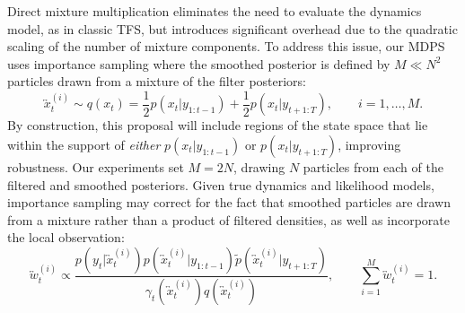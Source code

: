     
    Direct mixture multiplication eliminates the need to evaluate the dynamics model, as in classic TFS, but introduces significant overhead due to the quadratic scaling of the number of mixture components. To address this issue, our MDPS uses importance sampling where the smoothed posterior is defined by $M \ll N^2$ particles drawn from a mixture of the filter posteriors:
    \begin{equation}
        \overleftrightarrow{x}_{t}^{(i)} \sim q(x_t) = \frac{1}{2}p(x_t|y_{1:t-1}) + \frac{1}{2} p(x_t|y_{t+1:T}), \quad\quad i=1,\ldots,M.
        \label{eqn:mdps_resampling_for_combination}
    \end{equation}
    By construction, this proposal will include regions of the state space that lie within the support of \emph{either} $p(x_t|y_{1:t-1})$ or $p(x_t|y_{t+1:T})$, improving robustness.  
    Our experiments set $M=2N$, drawing $N$ particles from each of the filtered and smoothed posteriors.
    Given true dynamics and likelihood models, importance sampling may correct for the fact that smoothed particles are drawn from a mixture rather than a product of filtered densities, as well as incorporate the local observation:
    \begin{equation}
        \overleftrightarrow{w}_{t}^{(i)} \propto \frac{ p(y_t|\overleftrightarrow{x}_{t}^{(i)}) p(\overleftrightarrow{x}_{t}^{(i)}|y_{1:t-1}) \tilde{p}(\overleftrightarrow{x}_{t}^{(i)}| y_{t+1:T})  }{\gamma_t(\overleftrightarrow{x}_{t}^{(i)}) q(\overleftrightarrow{x}_{t}^{(i)})},
        \qquad \sum_{i=1}^{M} \overleftrightarrow{w}_{t}^{(i)} = 1.
        \label{eqn:mdps_weights}
    \end{equation} 
